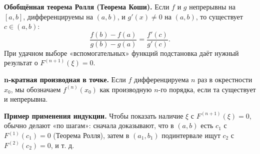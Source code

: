 
\textbf{Обобщённая теорема Ролля (Теорема Коши).}
Если $f$ и $g$ непрерывны на $[a,b]$, дифференцируемы на $(a,b)$, и $g'(x)\neq 0$ на $(a,b)$, то существует $c\in(a,b)$:
\[
\frac{f(b)-f(a)}{g(b)-g(a)} = \frac{f'(c)}{g'(c)}.
\]
При удачном выборе «вспомогательных» функций подстановка даёт нужный результат о $F^{(n+1)}(\xi)=0$.

\medskip

\textbf{n-кратная производная в точке.}
Если $f$ дифференцируема $n$ раз в окрестности $x_0$, мы обозначаем $f^{(n)}(x_0)$ как производную $n$-го порядка, если та существует и непрерывна.

\medskip

\textbf{Пример применения индукции.}
Чтобы показать наличие $\xi$ с $F^{(n+1)}(\xi)=0$, обычно делают «по шагам»: сначала доказывают, что в $(a,b)$ есть $c_1$ с $F^{(1)}(c_1)=0$ (Теорема Ролля), затем в $(a_1,b_1)$ подинтервале ищут $c_2$ с $F^{(2)}(c_2)=0$, и т. д.
